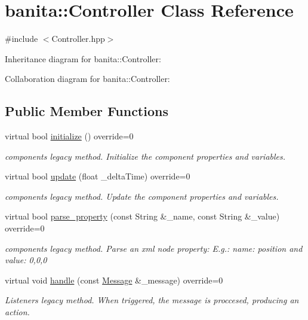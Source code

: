 \hypertarget{classbanita_1_1_controller}{}\section{banita\+::Controller Class Reference}
\label{classbanita_1_1_controller}


{\ttfamily \#include $<$Controller.\+hpp$>$}



Inheritance diagram for banita\+::Controller\+:


Collaboration diagram for banita\+::Controller\+:
\subsection*{Public Member Functions}
\begin{DoxyCompactItemize}
\item 
virtual bool \mbox{\hyperlink{classbanita_1_1_controller_a3a3bc92a032f22f0cd20cbff0f89d175}{initialize}} () override=0
\begin{DoxyCompactList}\small\item\em component\textquotesingle{}s legacy method. Initialize the component properties and variables. \end{DoxyCompactList}\item 
virtual bool \mbox{\hyperlink{classbanita_1_1_controller_a44363ca0ed1ba66a9f6c079a6b158d94}{update}} (float \+\_\+delta\+Time) override=0
\begin{DoxyCompactList}\small\item\em component\textquotesingle{}s legacy method. Update the component properties and variables. \end{DoxyCompactList}\item 
virtual bool \mbox{\hyperlink{classbanita_1_1_controller_a74933400a4ed56e68ce5cb11ec395a1b}{parse\+\_\+property}} (const String \&\+\_\+name, const String \&\+\_\+value) override=0
\begin{DoxyCompactList}\small\item\em component\textquotesingle{}s legacy method. Parse an xml node property\+: E.\+g.\+: name\+: position and value\+: 0,0,0 \end{DoxyCompactList}\item 
virtual void \mbox{\hyperlink{classbanita_1_1_controller_a2feb550d530941ed11312fbbb7730c80}{handle}} (const \mbox{\hyperlink{classbanita_1_1_message}{Message}} \&\+\_\+message) override=0
\begin{DoxyCompactList}\small\item\em Listener\textquotesingle{}s legacy method. When triggered, the message is proccesed, producing an action. \end{DoxyCompactList}\item 

\end{DoxyCompactItemize}

